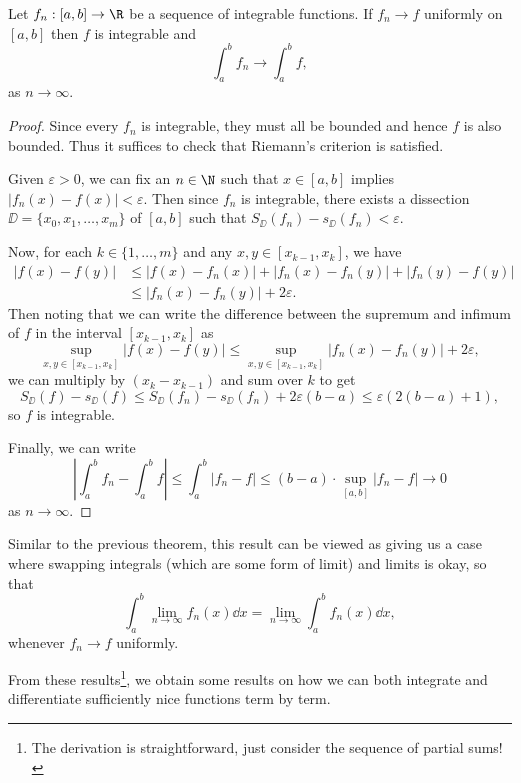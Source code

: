 \begin{theorem}\label{thm3}
Let $f_n: [a, b] \rightarrow \R$ be a sequence of integrable functions. If $f_n \rightarrow f$ uniformly on $[a, b]$ then $f$ is integrable and
$$
\int_a^b f_n \rightarrow \int_a^b f,
$$
as $n \rightarrow \infty$.
\end{theorem}
\begin{proof}
    Since every $f_n$ is integrable, they must all be bounded and hence $f$ is also bounded. Thus it suffices to check that Riemann's criterion is satisfied.

    Given $\varepsilon > 0$, we can fix an $n \in \N$ such that $x \in [a, b]$ implies $|f_n(x) - f(x)| < \varepsilon$. Then since $f_n$ is integrable, there exists a dissection $\DD = \{x_0, x_1, \dots, x_m\}$ of $[a, b]$ such that $S_{\DD}(f_n) - s_{\DD}(f_n) < \varepsilon$. 

    Now, for each $k \in \{1, \dots, m\}$ and any $x,y \in[x_{k - 1}, x_k]$, we have
    \begin{align*}
        |f(x) - f(y)| &\leq |f(x) - f_n(x)| + |f_n(x) - f_n(y)| + |f_n(y) - f(y)| \\
        &\leq |f_n(x) - f_n(y)| + 2 \varepsilon.
    \end{align*}
    Then noting that we can write the difference between the supremum and infimum of $f$ in the interval $[x_{k - 1}, x_k]$ as
    $$
        \sup_{x, y \in [x_{k - 1}, x_k]} |f(x) - f(y)| \leq \sup_{x, y \in [x_{k - 1}, x_k]} |f_n(x) - f_n(y)| + 2 \varepsilon,
    $$
    we can multiply by $(x_k - x_{k - 1})$ and sum over $k$ to get 
    $$ 
    S_{\DD}(f) - s_{\DD}(f) \leq S_{\DD}(f_n) - s_{\DD}(f_n) + 2 \varepsilon (b - a) \leq \varepsilon (2(b - a) + 1),
    $$
    so $f$ is integrable.

    Finally, we can write
    $$
    \left|\int_a^b f_n - \int_a^b f\right| \leq \int_a^b |f_n - f| \leq (b - a) \cdot \sup_{[a, b]} |f_n - f| \rightarrow 0
    $$
    as $n \rightarrow \infty$.
\end{proof}

Similar to the previous theorem, this result can be viewed as giving us a case where swapping integrals (which are some form of limit) and limits is okay, so that
$$
    \int_a^b \lim_{n \to \infty} f_n(x) \dd x = \lim_{n \to \infty} \int_a^b f_n(x) \dd x,
$$
whenever $f_n \rightarrow f$ uniformly.


From these results\footnote{The derivation is straightforward, just consider the sequence of partial sums!}, we obtain some results on how we can both integrate and differentiate sufficiently nice functions term by term.

